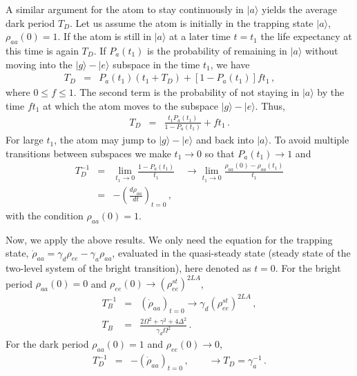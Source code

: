 \documentclass[twocolumn,aps,eqsecnum,showkeys,amsmath]{revtex4-2}
\begin{document}
A similar argument for the atom to stay continuously in $| a \rangle$ yields 
the average dark period $T_D$. Let us assume the atom is initially in the 
trapping state $| a \rangle$, $\rho_{aa}(0)=1$. If the atom is still in 
$| a \rangle$ at a later time $t=t_1$ the life expectancy at this time is again 
$T_D$. If $P_{a}(t_1)$ is the probability of remaining in $| a \rangle$ 
without moving into the $| g \rangle - | e \rangle$ subspace in the time 
$t_1$, we have  
%
\begin{eqnarray}
T_D &=& P_{a}(t_1) (t_1+ T_D) +[1- P_{a}(t_1)] f t_1 \,, \qquad
\end{eqnarray}
where $0 \leq f \leq 1$. The second term is the probability of not staying 
in $| a \rangle$ by the time $f t_1$ at which the atom moves to the 
subspace $| g \rangle - | e \rangle$. Thus, 
%
\begin{eqnarray}
T_D &=& \frac{t_1 P_{a}(t_1)}{ 1- P_{a}(t_1) } +f t_1  	\,.
\end{eqnarray}
For large $t_1$, the atom may jump to $| g \rangle - | e \rangle$ and 
back into $| a \rangle$. To avoid multiple transitions between subspaces 
we make $t_1 \to 0$ so that $P_{a} (t_1) \to 1$ and 
%
\begin{eqnarray}
T_D^{-1} &=& \lim_{t_1 \to 0} \frac{ 1- P_a (t_1) }{t_1} 		\quad \to 
 	\lim_{t_1 \to 0} \frac{ \rho_{aa} (0) - \rho_{aa} (t_1) }{t_1} 	\nonumber \\
&=& - \left( \frac{ d \rho_{aa} }{dt} \right)_{t=0} \,,
\end{eqnarray}
with the condition $\rho_{aa}(0) =1$. 

Now, we apply the above results. We only need the equation for the trapping 
state, $\dot{\rho}_{aa} = \gamma_d \rho_{ee} -\gamma_a \rho_{aa}$, 
evaluated in the quasi-steady state (steady state of the two-level system of 
the bright transition), here denoted as $t=0$. For the bright period 
$\rho_{aa}(0) =0$ and $\rho_{ee}(0) \to (\rho_{ee}^{st})^{2LA}$, 
%
\begin{eqnarray}    
T_B^{-1} &=& (\dot{\rho}_{aa})_{t=0} 	\to \gamma_d (\rho_{ee}^{st})^{2LA} \,, \nonumber  \\  
T_B &=& \frac{2\Omega^2 +\gamma^2 +4\Delta^2}{\gamma_d \Omega^2} \,. 
\end{eqnarray}
For the dark period $\rho_{aa}(0) =1$ and $\rho_{ee}(0) \to 0$,
%
\begin{eqnarray}    
T_D^{-1} &=& - (\dot{\rho}_{aa})_{t=0} \,, 	\qquad \to 
	T_D = \gamma_a^{-1} \,.
\end{eqnarray}
\end{document}
